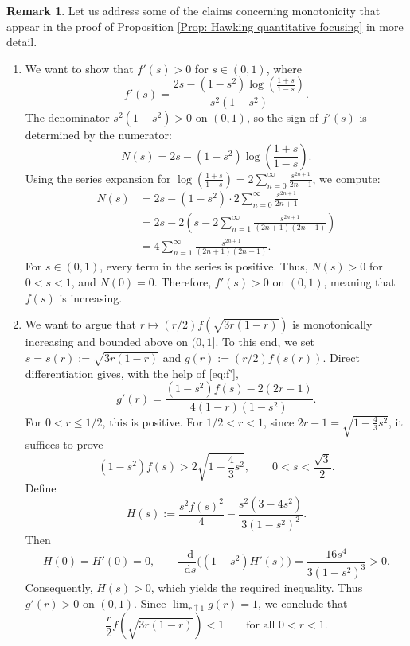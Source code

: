 \documentclass[a4paper,11pt]{article}
\numberwithin{equation}{section}
\theoremstyle{definition}
\newtheorem{Remark}[Definition]{Remark}
\theoremstyle{plain}
\newcommand*\diff{\mathop{}\!\mathrm{d}}
\begin{document}
\begin{Remark}
\label{Remark: monotonicities}
Let us address some of the claims concerning monotonicity that appear in the proof of Proposition \ref{Prop: Hawking quantitative focusing} in more detail.
\begin{enumerate}
\item\label{mono1}
We want to show that \( f'(s) > 0 \) for \( s \in (0,1) \), where
\begin{equation}\label{eq:f'}
f'(s) = \frac{2s - (1-s^2) \log \left( \frac{1+s}{1-s} \right)}{s^2(1-s^2)}.
\end{equation}
The denominator \( s^2(1-s^2) > 0 \) on \( (0,1) \), so the sign of \( f'(s) \) is determined by the numerator:
\[
N(s) = 2s - (1-s^2) \log \left( \frac{1+s}{1-s} \right).
\]
Using the series expansion for \( \log \left( \frac{1+s}{1-s} \right) = 2 \sum_{n=0}^\infty \frac{s^{2n+1}}{2n+1} \), we compute:
\[
\begin{aligned}
N(s) &= 2s - (1-s^2) \cdot 2 \sum_{n=0}^\infty \frac{s^{2n+1}}{2n+1} \\
&= 2s - 2 \left( s - 2 \sum_{n=1}^\infty \frac{s^{2n+1}}{(2n+1)(2n-1)} \right) \\
&= 4 \sum_{n=1}^\infty \frac{s^{2n+1}}{(2n+1)(2n-1)}.
\end{aligned}
\]
For \( s \in (0,1) \), every term in the series is positive. Thus, \( N(s) > 0 \) for \( 0 < s < 1 \), and \( N(0) = 0 \). Therefore, \( f'(s) > 0 \) on \( (0,1) \), meaning that \( f(s) \) is  increasing.
\item\label{mono2}
We want to argue that $r \mapsto (r/2)f(\sqrt{3r(1-r)})$ is monotonically increasing and bounded above on $(0,1]$.
To this end, we set $s = s(r):=\sqrt{3r(1-r)}$ and $g(r):=(r/2)f(s(r))$. 
Direct differentiation gives, with the help of \eqref{eq:f'},
\[
g'(r)
=
\frac{(1-s^2)f(s)-2(2r-1)}
     {4(1-r)(1-s^2)}.
\]
For \(0<r\leq 1/2\), this is positive. 
For
\(1/2<r<1\), since
\(2r-1=\sqrt{1-\frac43s^2}\), it suffices to prove
\[
(1-s^2)f(s)>2\sqrt{1-\frac43s^2},
\qquad 0<s<\frac{\sqrt{3}}{2}.
\]
Define
\[
H(s):=
\frac{s^2f(s)^2}{4}
-\frac{s^2(3-4s^2)}{3(1-s^2)^2}.
\]
Then
\[
H(0)=H'(0)=0,
\qquad
\frac{\diff}{\diff s}\bigl((1-s^2)H'(s)\bigr)
=
\frac{16s^4}{3(1-s^2)^3}>0.
\]
Consequently, \(H(s)>0\), which yields the required inequality.
Thus \(g'(r)>0\) on \((0,1)\). Since
\(\lim_{r\uparrow1}g(r)=1\), we conclude that
\[
\frac{r}{2}f\!\left(\sqrt{3r(1-r)}\right)<1
\qquad\text{for all }0<r<1.
\]
\end{enumerate}
\end{Remark}
\end{document}
